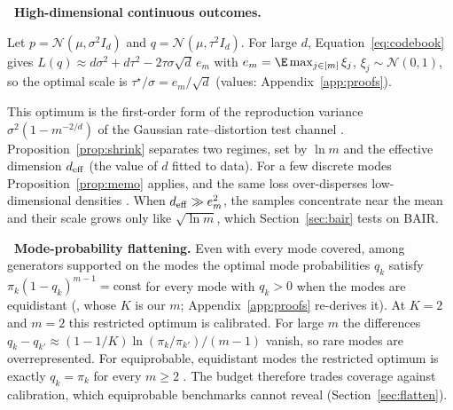 \leavevmode{}\textbf{\thesubsection\ High-dimensional continuous outcomes.}
\label{sec:theory_shrink}
\begin{proposition}
\label{prop:shrink}
Let $p = \mathcal{N}(\mu, \sigma^2 I_d)$ and $q = \mathcal{N}(\mu, \tau^2 I_d)$. For large $d$, Equation~\ref{eq:codebook} gives $L(q) \approx d\sigma^2 + d \tau^2 - 2 \tau \sigma \sqrt{d}\, e_m$ with $e_m = \E\max_{j \in [m]} \xi_j$, $\xi_j \sim \mathcal{N}(0,1)$, so the optimal scale is $\tau^\star/\sigma = e_m/\sqrt{d}$ (values: Appendix~\ref{app:proofs}).
\end{proposition}
This optimum is the first-order form of the reproduction variance $\sigma^2(1 - m^{-2/d})$ of the Gaussian rate--distortion test channel \citep{cover2006elements}. Proposition~\ref{prop:shrink} separates two regimes, set by $\ln m$ and the effective dimension $d_{\mathrm{eff}}$ (the value of $d$ fitted to data). For a few discrete modes Proposition~\ref{prop:memo} applies, and the same loss over-disperses low-dimensional densities \citep{thiede2019variety}. When $d_{\mathrm{eff}} \gg e_m^2$, the samples concentrate near the mean and their scale grows only like $\sqrt{\ln m}$, which Section~\ref{sec:bair} tests on BAIR.

\leavevmode{}\textbf{\thesubsection\ Mode-probability flattening.}
\label{sec:theory_flatten}
Even with every mode covered, among generators supported on the modes the optimal mode probabilities $q_k$ satisfy $\pi_k (1 - q_k)^{m-1} = \mathrm{const}$ for every mode with $q_k > 0$ when the modes are equidistant (\citealp[Theorem~7]{bennett2026freedom}, whose $K$ is our $m$; Appendix~\ref{app:proofs} re-derives it). At $K{=}2$ and $m{=}2$ this restricted optimum is calibrated. For large $m$ the differences $q_k - q_{k'} \approx (1-1/K)\ln(\pi_k/\pi_{k'})/(m-1)$ vanish, so rare modes are overrepresented. For equiprobable, equidistant modes the restricted optimum is exactly $q_k = \pi_k$ for every $m \ge 2$ \citep[Theorem~4]{bennett2026freedom}. The budget therefore trades coverage against calibration, which equiprobable benchmarks cannot reveal (Section~\ref{sec:flatten}).

